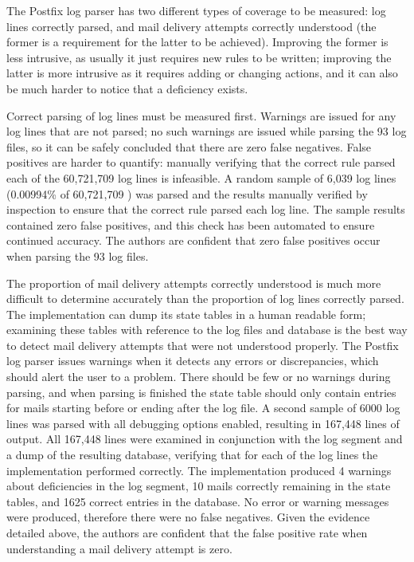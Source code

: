 \documentclass{svmult}
\newcommand{\numberOFlogFILES}[0]{%
    93%
}
\newcommand{\numberOFlogLINES}[0]{%
    60,721,709%
}
\begin{document}
\label{coverage}

The Postfix log parser has two different types of coverage to be measured:
log lines correctly parsed, and mail delivery attempts correctly understood
(the former is a requirement for the latter to be achieved).  Improving the
former is less intrusive, as usually it just requires new rules to be
written; improving the latter is more intrusive as it requires adding or
changing actions, and it can also be much harder to notice that a
deficiency exists.

Correct parsing of log lines must be measured first.  Warnings are issued
for any log lines that are not parsed; no such warnings are issued while
parsing the \numberOFlogFILES{} log files, so it can be safely concluded
that there are zero false negatives.  False positives are harder to
quantify: manually verifying that the correct rule parsed each of the
\numberOFlogLINES{} log lines is infeasible.  A random sample of 6,039 log
lines (0.00994\% of \numberOFlogLINES{}) was parsed and the results
manually verified by inspection to ensure that the correct rule parsed each
log line.  The sample results contained zero false positives, and this
check has been automated to ensure continued accuracy.  The authors are
confident that zero false positives occur when parsing the
\numberOFlogFILES{} log files.

The proportion of mail delivery attempts correctly understood is much more
difficult to determine accurately than the proportion of log lines
correctly parsed.  The implementation can dump its state tables in a human
readable form; examining these tables with reference to the log files and
database is the best way to detect mail delivery attempts that were not
understood properly.  The Postfix log parser issues warnings when it
detects any errors or discrepancies, which should alert the user to a
problem.  There should be few or no warnings during parsing, and when
parsing is finished the state table should only contain entries for mails
starting before or ending after the log file.  A second sample of 6000 log
lines was parsed with all debugging options enabled, resulting in 167,448
lines of output.  All 167,448 lines were examined in conjunction with the
log segment and a dump of the resulting database, verifying that for each
of the log lines the implementation performed correctly.  The
implementation produced 4 warnings about deficiencies in the log segment,
10 mails correctly remaining in the state tables, and 1625 correct entries
in the database.  No error or warning messages were produced, therefore
there were no false negatives.  Given the evidence detailed above, the
authors are confident that the false positive rate when understanding a
mail delivery attempt is zero.
\end{document}
